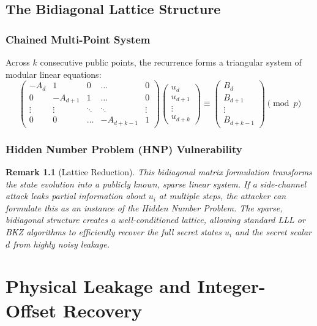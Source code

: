 \documentclass[11pt, a4paper, twoside]{book}
\newtheorem{remark}[theorem]{Remark}
\begin{document}
\chapter{The Bidiagonal Lattice Structure}

\section{Chained Multi-Point System}
Across $k$ consecutive public points, the recurrence forms a triangular system of modular linear equations:
\begin{equation}
\begin{pmatrix}
-A_d & 1 & 0 & \dots & 0 \\
0 & -A_{d+1} & 1 & \dots & 0 \\
\vdots & \vdots & \ddots & \ddots & \vdots \\
0 & 0 & \dots & -A_{d+k-1} & 1
\end{pmatrix}
\begin{pmatrix}
u_d \\ u_{d+1} \\ \vdots \\ u_{d+k}
\end{pmatrix}
\equiv
\begin{pmatrix}
B_d \\ B_{d+1} \\ \vdots \\ B_{d+k-1}
\end{pmatrix} \pmod p
\end{equation}

\section{Hidden Number Problem (HNP) Vulnerability}
\begin{remark}[Lattice Reduction]
This bidiagonal matrix formulation transforms the state evolution into a publicly known, sparse linear system. If a side-channel attack leaks partial information about $u_i$ at multiple steps, the attacker can formulate this as an instance of the Hidden Number Problem. The sparse, bidiagonal structure creates a well-conditioned lattice, allowing standard LLL or BKZ algorithms to efficiently recover the full secret states $u_i$ and the secret scalar $d$ from highly noisy leakage.
\end{remark}

\part{Physical Leakage and Integer-Offset Recovery}
\end{document}
